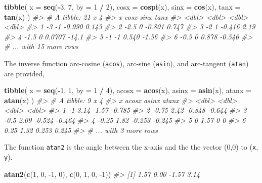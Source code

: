 \documentclass[]{book}
\newenvironment{Shaded}{\begin{snugshade}}{\end{snugshade}}
\newcommand{\CommentTok}[1]{\textcolor[rgb]{0.56,0.35,0.01}{\textit{#1}}}
\newcommand{\DataTypeTok}[1]{\textcolor[rgb]{0.13,0.29,0.53}{#1}}
\newcommand{\DecValTok}[1]{\textcolor[rgb]{0.00,0.00,0.81}{#1}}
\newcommand{\KeywordTok}[1]{\textcolor[rgb]{0.13,0.29,0.53}{\textbf{#1}}}
\newcommand{\NormalTok}[1]{#1}
\newcommand{\OperatorTok}[1]{\textcolor[rgb]{0.81,0.36,0.00}{\textbf{#1}}}
\newcommand{\StringTok}[1]{\textcolor[rgb]{0.31,0.60,0.02}{#1}}
\theoremstyle{plain}
\theoremstyle{remark}
\theoremstyle{definition}
\theoremstyle{definition}
\theoremstyle{definition}
\theoremstyle{remark}
\begin{document}
\begin{Shaded}
\begin{Highlighting}[]
\KeywordTok{tibble}\NormalTok{(}
  \DataTypeTok{x =} \KeywordTok{seq}\NormalTok{(}\OperatorTok{-}\DecValTok{3}\NormalTok{, }\DecValTok{7}\NormalTok{, }\DataTypeTok{by =} \DecValTok{1} \OperatorTok{/}\StringTok{ }\DecValTok{2}\NormalTok{),}
  \DataTypeTok{cosx =} \KeywordTok{cospi}\NormalTok{(x),}
  \DataTypeTok{sinx =} \KeywordTok{cos}\NormalTok{(x),}
  \DataTypeTok{tanx =} \KeywordTok{tan}\NormalTok{(x)}
\NormalTok{)}
\CommentTok{#> # A tibble: 21 x 4}
\CommentTok{#>       x  cosx    sinx    tanx}
\CommentTok{#>   <dbl> <dbl>   <dbl>   <dbl>}
\CommentTok{#> 1  -3      -1 -0.990    0.143}
\CommentTok{#> 2  -2.5     0 -0.801    0.747}
\CommentTok{#> 3  -2       1 -0.416    2.19 }
\CommentTok{#> 4  -1.5     0  0.0707 -14.1  }
\CommentTok{#> 5  -1      -1  0.540   -1.56 }
\CommentTok{#> 6  -0.5     0  0.878   -0.546}
\CommentTok{#> # ... with 15 more rows}
\end{Highlighting}
\end{Shaded}

The inverse function arc-cosine (\texttt{acos}), arc-sine
(\texttt{asin}), and arc-tangent (\texttt{atan}) are provided,

\begin{Shaded}
\begin{Highlighting}[]
\KeywordTok{tibble}\NormalTok{(}
  \DataTypeTok{x =} \KeywordTok{seq}\NormalTok{(}\OperatorTok{-}\DecValTok{1}\NormalTok{, }\DecValTok{1}\NormalTok{, }\DataTypeTok{by =} \DecValTok{1} \OperatorTok{/}\StringTok{ }\DecValTok{4}\NormalTok{),}
  \DataTypeTok{acosx =} \KeywordTok{acos}\NormalTok{(x),}
  \DataTypeTok{asinx =} \KeywordTok{asin}\NormalTok{(x),}
  \DataTypeTok{atanx =} \KeywordTok{atan}\NormalTok{(x)}
\NormalTok{)}
\CommentTok{#> # A tibble: 9 x 4}
\CommentTok{#>       x acosx  asinx  atanx}
\CommentTok{#>   <dbl> <dbl>  <dbl>  <dbl>}
\CommentTok{#> 1 -1     3.14 -1.57  -0.785}
\CommentTok{#> 2 -0.75  2.42 -0.848 -0.644}
\CommentTok{#> 3 -0.5   2.09 -0.524 -0.464}
\CommentTok{#> 4 -0.25  1.82 -0.253 -0.245}
\CommentTok{#> 5  0     1.57  0      0    }
\CommentTok{#> 6  0.25  1.32  0.253  0.245}
\CommentTok{#> # ... with 3 more rows}
\end{Highlighting}
\end{Shaded}

The function \texttt{atan2} is the angle between the x-axis and the the
vector (0,0) to (\texttt{x}, \texttt{y}).

\begin{Shaded}
\begin{Highlighting}[]
\KeywordTok{atan2}\NormalTok{(}\KeywordTok{c}\NormalTok{(}\DecValTok{1}\NormalTok{, }\DecValTok{0}\NormalTok{, }\DecValTok{-1}\NormalTok{, }\DecValTok{0}\NormalTok{), }\KeywordTok{c}\NormalTok{(}\DecValTok{0}\NormalTok{, }\DecValTok{1}\NormalTok{, }\DecValTok{0}\NormalTok{, }\DecValTok{-1}\NormalTok{))}
\CommentTok{#> [1]  1.57  0.00 -1.57  3.14}
\end{Highlighting}
\end{Shaded}
\end{document}
